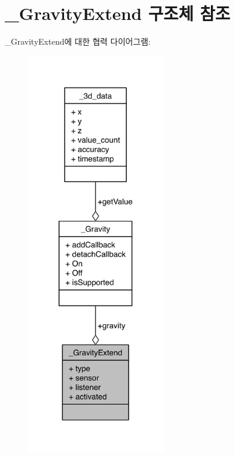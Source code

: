 \hypertarget{struct__GravityExtend}{\section{\-\_\-\-Gravity\-Extend 구조체 참조}
\label{struct__GravityExtend}
}


\-\_\-\-Gravity\-Extend에 대한 협력 다이어그램\-:\nopagebreak
\begin{figure}[H]
\begin{center}
\leavevmode
\includegraphics[width=173pt]{df/d08/struct__GravityExtend__coll__graph}
\end{center}
\end{figure}
